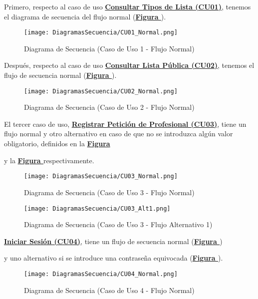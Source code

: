 \addtocounter{figura}{1}
Primero, respecto al caso de uso \textbf{\hyperref[tab:cuuConsultaTiposLst]{Consultar Tipos de Lista (CU01)}}, tenemos el diagrama de secuencia del flujo normal (\textbf{\hyperref[fig:Secuencia_CU1_Normal]{Figura }}).
\begin{figure}[!htbp]
  \centering
  \texttt{[image: DiagramasSecuencia/CU01\_Normal.png]}
  \caption{Diagrama de Secuencia (Caso de Uso 1 - Flujo Normal)}
  \label{fig:Secuencia_CU1_Normal}
\end{figure}
\FloatBarrier

\addtocounter{figura}{1}
Después, respecto al caso de uso \textbf{\hyperref[tab:cuuConsultaLstPub]{Consultar Lista Pública (CU02)}}, tenemos el flujo de secuencia normal (\textbf{\hyperref[fig:Secuencia_CU2_Normal]{Figura }}).
\begin{figure}[!htbp]
  \centering
  \texttt{[image: DiagramasSecuencia/CU02\_Normal.png]}
  \caption{Diagrama de Secuencia (Caso de Uso 2 - Flujo Normal)}
  \label{fig:Secuencia_CU2_Normal}
\end{figure}
\FloatBarrier

\addtocounter{figura}{1}
El tercer caso de uso, \textbf{\hyperref[tab:cuuRegPeticProf]{Registrar Petición de Profesional (CU03)}}, tiene un flujo normal y otro alternativo en caso de que no se introduzca algún valor obligatorio, definidos en la \textbf{\hyperref[fig:Secuencia_CU3_Normal]{Figura }}\addtocounter{figura}{1} y la \textbf{\hyperref[fig:Secuencia_CU3_Alt1]{Figura }} respectivamente.
\begin{figure}[!htbp]
  \centering
  \texttt{[image: DiagramasSecuencia/CU03\_Normal.png]}
  \caption{Diagrama de Secuencia (Caso de Uso 3 - Flujo Normal)}
  \label{fig:Secuencia_CU3_Normal}
\end{figure}
\FloatBarrier

\begin{figure}[!htbp]
  \centering
  \texttt{[image: DiagramasSecuencia/CU03\_Alt1.png]}
  \caption{Diagrama de Secuencia (Caso de Uso 3 - Flujo Alternativo 1)}
  \label{fig:Secuencia_CU3_Alt1}
\end{figure}
\FloatBarrier

\addtocounter{figura}{1}
\textbf{\hyperref[tab:cucIniSes]{Iniciar Sesión (CU04)}}, tiene un flujo de secuencia normal (\textbf{\hyperref[fig:Secuencia_CU4_Normal]{Figura }}) \addtocounter{figura}{1} y uno alternativo si se introduce una contraseña equivocada (\textbf{\hyperref[fig:Secuencia_CU4_Alt1]{Figura }}).
\begin{figure}[!htbp]
  \centering
  \texttt{[image: DiagramasSecuencia/CU04\_Normal.png]}
  \caption{Diagrama de Secuencia (Caso de Uso 4 - Flujo Normal)}
  \label{fig:Secuencia_CU4_Normal}
\end{figure}
\FloatBarrier

